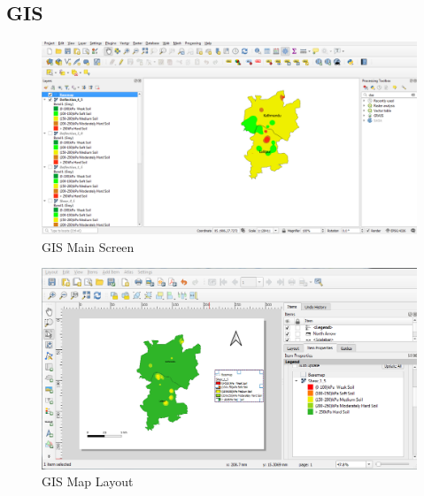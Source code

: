 \begin{landscape}
\section{GIS}
\begin{figure}[hbtp]
  \centering
  \includegraphics[width=0.8\linewidth, height=0.8\textheight,keepaspectratio]{images/gis/Screenshot (1).png}
  \caption{GIS Main Screen}
\end{figure}
\end{landscape}
\pagebreak
\begin{landscape}
\begin{figure}[hbtp]
  \centering
  \includegraphics[width=\linewidth, height=\textheight,keepaspectratio]{images/gis/Screenshot (2).png}
  \caption{GIS Map Layout}
\end{figure}
\end{landscape}
\pagebreak

